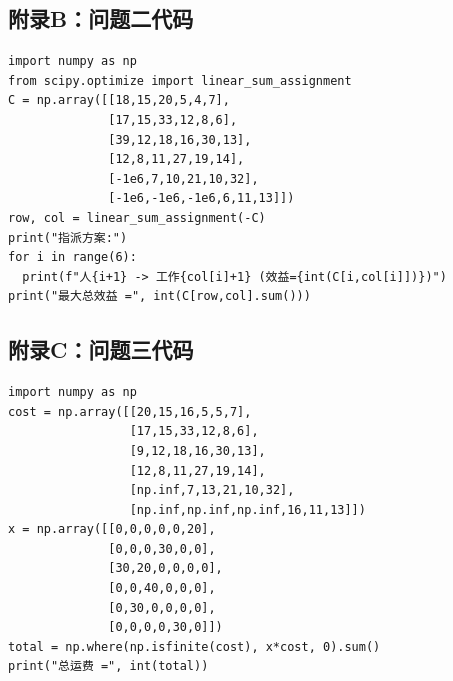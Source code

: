 \documentclass[12pt]{ctexart}
\begin{document}
\subsection{附录B：问题二代码}
\begin{verbatim}
import numpy as np
from scipy.optimize import linear_sum_assignment
C = np.array([[18,15,20,5,4,7],
              [17,15,33,12,8,6],
              [39,12,18,16,30,13],
              [12,8,11,27,19,14],
              [-1e6,7,10,21,10,32],
              [-1e6,-1e6,-1e6,6,11,13]])
row, col = linear_sum_assignment(-C)
print("指派方案:")
for i in range(6):
  print(f"人{i+1} -> 工作{col[i]+1} (效益={int(C[i,col[i]])})")
print("最大总效益 =", int(C[row,col].sum()))
\end{verbatim}

\subsection{附录C：问题三代码}
\begin{verbatim}
import numpy as np
cost = np.array([[20,15,16,5,5,7],
                 [17,15,33,12,8,6],
                 [9,12,18,16,30,13],
                 [12,8,11,27,19,14],
                 [np.inf,7,13,21,10,32],
                 [np.inf,np.inf,np.inf,16,11,13]])
x = np.array([[0,0,0,0,0,20],
              [0,0,0,30,0,0],
              [30,20,0,0,0,0],
              [0,0,40,0,0,0],
              [0,30,0,0,0,0],
              [0,0,0,0,30,0]])
total = np.where(np.isfinite(cost), x*cost, 0).sum()
print("总运费 =", int(total))
\end{verbatim}
\end{document}
